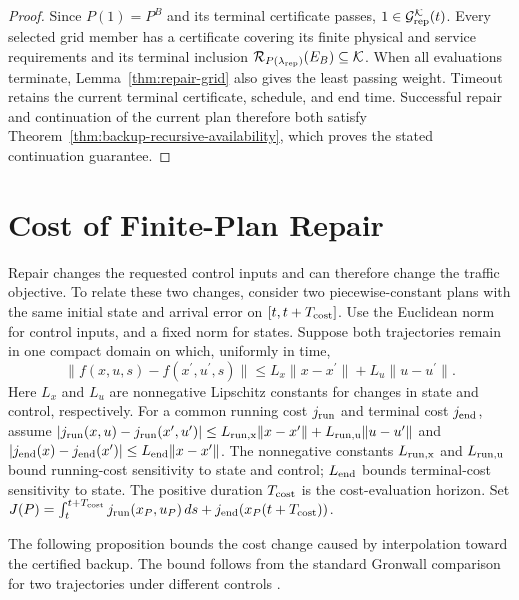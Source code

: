 \documentclass[final]{cas-sc}
\theoremstyle{definition}
\theoremstyle{plain}
\theoremstyle{definition}
\theoremstyle{plain}
\begin{document}
\begin{proof}
Since $P(1)=P^B$ and its terminal certificate passes,
$1\in\mathcal G_{\rm rep}^{\mathcal K}(t)$. Every selected grid
member has a certificate covering its finite physical and service
requirements and its terminal inclusion
$\mathcal R_{P(\lambda_{\rm rep})}(E_B)\subseteq\mathcal K$.
When all evaluations terminate, Lemma~\ref{thm:repair-grid} also gives
the least passing weight. Timeout retains the current terminal
certificate, schedule, and end time. Successful repair and continuation of the current plan
therefore both satisfy Theorem~\ref{thm:backup-recursive-availability},
which proves the stated continuation guarantee.
\end{proof}

\section{Cost of Finite-Plan Repair}
\label{sec:repair-cost-bound}
\label{app:repair-cost}

Repair changes the requested control inputs and can therefore change the
traffic objective. To relate these two changes, consider two piecewise-constant
plans with the same initial state and arrival error on $[t,t+T_{\rm cost}]$.
Use the Euclidean norm for control inputs, and a fixed norm for states.
Suppose both trajectories remain in one compact
domain on which, uniformly in time,
\[
\|f(x,u,s)-f(x^{\prime},u^{\prime},s)\|
\le L_x\|x-x^{\prime}\|+L_u\|u-u^{\prime}\|.
\]
Here $L_x$ and $L_u$ are nonnegative Lipschitz constants for changes
in state and control, respectively. For a common running cost
$j_{\rm run}$ and terminal cost $j_{\rm end}$, assume
$|j_{\rm run}(x,u)-j_{\rm run}(x^{\prime},u^{\prime})|\le L_{\rm run,x}\|x-x^{\prime}\|+
L_{\rm run,u}\|u-u^{\prime}\|$ and $|j_{\rm end}(x)-j_{\rm end}(x^{\prime})|\le L_{\rm end}\|x-x^{\prime}\|$.
The nonnegative constants $L_{\rm run,x}$ and $L_{\rm run,u}$ bound
running-cost sensitivity to state and control; $L_{\rm end}$ bounds
terminal-cost sensitivity to state. The positive duration $T_{\rm cost}$
is the cost-evaluation horizon. Set
$J(P)=\int_t^{t+T_{\rm cost}}j_{\rm run}(x_P,u_P)\,ds+j_{\rm end}(x_P(t+T_{\rm cost}))$.

The following proposition bounds the cost change caused by interpolation
toward the certified backup. The bound follows from the standard
Gronwall comparison for two trajectories under different controls
\cite{khalil2002nonlinear}.
\end{document}
